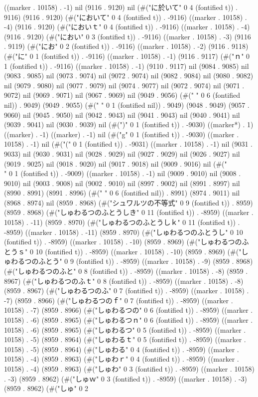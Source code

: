 {((marker . 10158) . -1) nil (9116 . 9120) nil (#("に於いて" 0 4 (fontified t)) . 9116) (9116 . 9120) (#("において" 0 4 (fontified t)) . -9116) ((marker . 10158) . -4) (9116 . 9120) (#("においｔ" 0 4 (fontified t)) . -9116) ((marker . 10158) . -4) (9116 . 9120) (#("におい" 0 3 (fontified t)) . -9116) ((marker . 10158) . -3) (9116 . 9119) (#("にお" 0 2 (fontified t)) . -9116) ((marker . 10158) . -2) (9116 . 9118) (#("に" 0 1 (fontified t)) . -9116) ((marker . 10158) . -1) (9116 . 9117) (#("ｎ" 0 1 (fontified t)) . -9116) ((marker . 10158) . -1) (9110 . 9117) nil (9084 . 9085) nil (9083 . 9085) nil (9073 . 9074) nil (9072 . 9074) nil (9082 . 9084) nil (9080 . 9082) nil (9079 . 9080) nil (9077 . 9079) nil (9074 . 9077) nil (9072 . 9074) nil (9071 . 9072) nil (9069 . 9071) nil (9067 . 9069) nil (9049 . 9056) (#("	     " 0 6 (fontified nil)) . 9049) (9049 . 9055) (#(" " 0 1 (fontified nil)) . 9049) (9048 . 9049) (9057 . 9060) nil (9045 . 9050) nil (9042 . 9043) nil (9041 . 9043) nil (9040 . 9041) nil (9039 . 9041) nil (9030 . 9039) nil (#(")" 0 1 (fontified t)) . -9030) ((marker*) . 1) ((marker) . -1) ((marker) . -1) nil (#("g" 0 1 (fontified t)) . -9030) ((marker . 10158) . -1) nil (#("(" 0 1 (fontified t)) . -9031) ((marker . 10158) . -1) nil (9031 . 9033) nil (9030 . 9031) nil (9028 . 9029) nil (9027 . 9029) nil (9026 . 9027) nil (9019 . 9025) nil (9018 . 9020) nil (9017 . 9018) nil (9009 . 9016) nil (#("\\" 0 1 (fontified t)) . -9009) ((marker . 10158) . -1) nil (9009 . 9010) nil (9008 . 9010) nil (9003 . 9008) nil (9002 . 9010) nil (8997 . 9002) nil (8991 . 8997) nil (8990 . 8991) (8991 . 8996) (#("	     " 0 6 (fontified nil)) . 8991) (8974 . 9011) nil (8968 . 8974) nil (8959 . 8968) (#("シュワルツの不等式" 0 9 (fontified t)) . 8959) (8959 . 8968) (#("しゅわるつのふとうしき" 0 11 (fontified t)) . -8959) ((marker . 10158) . -11) (8959 . 8970) (#("しゅわるつのふとうしｋ" 0 11 (fontified t)) . -8959) ((marker . 10158) . -11) (8959 . 8970) (#("しゅわるつのふとうし" 0 10 (fontified t)) . -8959) ((marker . 10158) . -10) (8959 . 8969) (#("しゅわるつのふとうｓ" 0 10 (fontified t)) . -8959) ((marker . 10158) . -10) (8959 . 8969) (#("しゅわるつのふとう" 0 9 (fontified t)) . -8959) ((marker . 10158) . -9) (8959 . 8968) (#("しゅわるつのふと" 0 8 (fontified t)) . -8959) ((marker . 10158) . -8) (8959 . 8967) (#("しゅわるつのふｔ" 0 8 (fontified t)) . -8959) ((marker . 10158) . -8) (8959 . 8967) (#("しゅわるつのふ" 0 7 (fontified t)) . -8959) ((marker . 10158) . -7) (8959 . 8966) (#("しゅわるつのｆ" 0 7 (fontified t)) . -8959) ((marker . 10158) . -7) (8959 . 8966) (#("しゅわるつの" 0 6 (fontified t)) . -8959) ((marker . 10158) . -6) (8959 . 8965) (#("しゅわるつｎ" 0 6 (fontified t)) . -8959) ((marker . 10158) . -6) (8959 . 8965) (#("しゅわるつ" 0 5 (fontified t)) . -8959) ((marker . 10158) . -5) (8959 . 8964) (#("しゅわるｔ" 0 5 (fontified t)) . -8959) ((marker . 10158) . -5) (8959 . 8964) (#("しゅわる" 0 4 (fontified t)) . -8959) ((marker . 10158) . -4) (8959 . 8963) (#("しゅわｒ" 0 4 (fontified t)) . -8959) ((marker . 10158) . -4) (8959 . 8963) (#("しゅわ" 0 3 (fontified t)) . -8959) ((marker . 10158) . -3) (8959 . 8962) (#("しゅｗ" 0 3 (fontified t)) . -8959) ((marker . 10158) . -3) (8959 . 8962) (#("しゅ" 0 2 }
